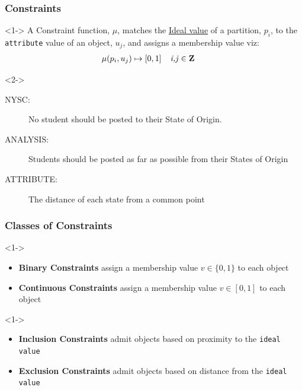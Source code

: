 \documentclass[10pt]{beamer}
\begin{document}
			\begin{frame}
				\frametitle{Constraints}
				\vfill
				\begin{definition}<1->
					A Constraint function, $\mu$, matches the \underline{Ideal value} of a partition, $p_i$, to the \texttt{attribute} value of an object, $u_j$, and assigns a membership value viz:
					\begin{align}
						\mu(p_i,u_j) &\mapsto [0,1] \textit{\ \ \  i,j $\in \mathbf{Z}$ }\notag
					\end{align}

				\end{definition}
				\vfill
				\begin{example}<2->
					\begin{description}
						\item [NYSC:] No student should be posted to their State of Origin.
						\item [ANALYSIS:] Students should be posted as far as possible from their States of Origin
						\item [ATTRIBUTE:] The distance of each state from a common point
					\end{description}
				\end{example}
			\end{frame}

			\begin{frame}
				\frametitle{Classes of Constraints}
				\vfill
				\begin{definition}<1->
					\begin{itemize}
						\item \textbf{Binary Constraints} assign a membership value $v \in \{0,1\}$ to each object
						\item \textbf{Continuous Constraints} assign a membership value $v \in [0,1]$ to each object
					\end{itemize}
				\end{definition}
				\begin{definition}<1->
					\begin{itemize}
						\item \textbf{Inclusion Constraints} admit objects based on proximity to the \texttt{ideal value}
						\item \textbf{Exclusion Constraints} admit objects based on distance from the \texttt{ideal value}
					\end{itemize}
				\end{definition}
			\end{frame}
\end{document}
